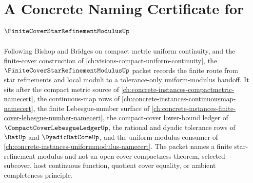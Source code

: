 \chapter{A Concrete Naming Certificate for $\FiniteCoverStarRefinementModulusUp$}
\label{ch:concrete-instances-finite-cover-star-refinement-modulus-namecert}

Following Bishop and Bridges on compact metric uniform continuity, and the finite-cover construction of \autoref{ch:visions-compact-uniform-continuity}, the $\FiniteCoverStarRefinementModulusUp$ packet records the finite route from star refinements and local moduli to a tolerance-only uniform-modulus handoff. It sits after the compact metric source of \autoref{ch:concrete-instances-compactmetric-namecert}, the continuous-map rows of \autoref{ch:concrete-instances-continuousmap-namecert}, the finite Lebesgue-number surface of \autoref{ch:concrete-instances-finite-cover-lebesgue-number-namecert}, the compact-cover lower-bound ledger of $\CompactCoverLebesgueLedgerUp$, the rational and dyadic tolerance rows of $\RatUp$ and $\DyadicRatCoreUp$, and the uniform-modulus consumer of \autoref{ch:concrete-instances-uniformmodulus-namecert}. The packet names a finite star-refinement modulus and not an open-cover compactness theorem, selected subcover, host continuous function, quotient cover equality, or ambient completeness principle.

